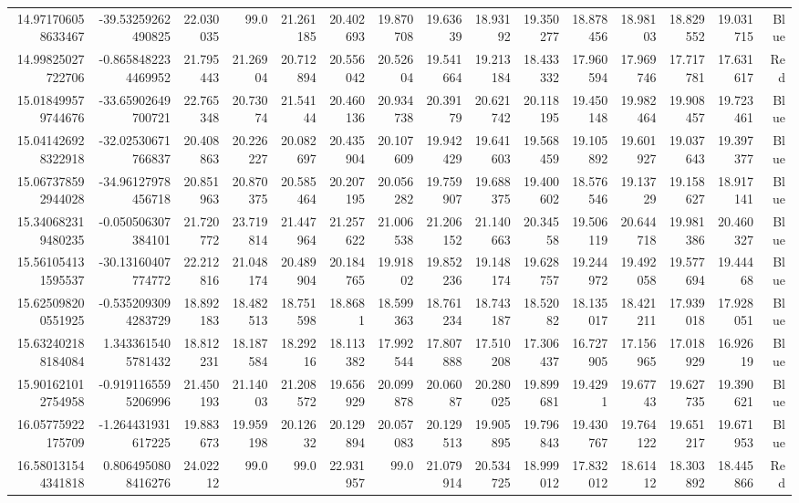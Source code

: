 \begin{center}
\begin{longtable}{rrrrrrrrrrrrrrr}
14.971706058633467 & -39.53259262490825 & 22.030035 & 99.0 & 21.261185 & 20.402693 & 19.870708 & 19.63639 & 18.93192 & 19.350277 & 18.878456 & 18.98103 & 18.829552 & 19.031715 & Blue \\
14.99825027722706 & -0.8658482234469952 & 21.795443 & 21.26904 & 20.712894 & 20.556042 & 20.52604 & 19.541664 & 19.213184 & 18.433332 & 17.960594 & 17.969746 & 17.717781 & 17.631617 & Red \\
15.018499579744676 & -33.65902649700721 & 22.765348 & 20.73074 & 21.54144 & 20.460136 & 20.934738 & 20.39179 & 20.621742 & 20.118195 & 19.450148 & 19.982464 & 19.908457 & 19.723461 & Blue \\
15.041426928322918 & -32.02530671766837 & 20.408863 & 20.226227 & 20.082697 & 20.435904 & 20.107609 & 19.942429 & 19.641603 & 19.568459 & 19.105892 & 19.601927 & 19.037643 & 19.397377 & Blue \\
15.067378592944028 & -34.96127978456718 & 20.851963 & 20.870375 & 20.585464 & 20.207195 & 20.056282 & 19.759907 & 19.688375 & 19.400602 & 18.576546 & 19.13729 & 19.158627 & 18.917141 & Blue \\
15.340682319480235 & -0.050506307384101 & 21.720772 & 23.719814 & 21.447964 & 21.257622 & 21.006538 & 21.206152 & 21.140663 & 20.34558 & 19.506119 & 20.644718 & 19.981386 & 20.460327 & Blue \\
15.561054131595537 & -30.13160407774772 & 22.212816 & 21.048174 & 20.489904 & 20.184765 & 19.91802 & 19.852236 & 19.148174 & 19.628757 & 19.244972 & 19.492058 & 19.577694 & 19.44468 & Blue \\
15.625098200551925 & -0.5352093094283729 & 18.892183 & 18.482513 & 18.751598 & 18.8681 & 18.599363 & 18.761234 & 18.743187 & 18.52082 & 18.135017 & 18.421211 & 17.939018 & 17.928051 & Blue \\
15.632402188184084 & 1.3433615405781432 & 18.812231 & 18.187584 & 18.29216 & 18.113382 & 17.992544 & 17.807888 & 17.510208 & 17.306437 & 16.727905 & 17.156965 & 17.018929 & 16.92619 & Blue \\
15.901621012754958 & -0.9191165595206996 & 21.450193 & 21.14003 & 21.208572 & 19.656929 & 20.099878 & 20.06087 & 20.280025 & 19.899681 & 19.4291 & 19.67743 & 19.627735 & 19.390621 & Blue \\
16.05775922175709 & -1.264431931617225 & 19.883673 & 19.959198 & 20.12632 & 20.129894 & 20.057083 & 20.129513 & 19.905895 & 19.796843 & 19.430767 & 19.764122 & 19.651217 & 19.671953 & Blue \\
16.580131544341818 & 0.8064950808416276 & 24.02212 & 99.0 & 99.0 & 22.931957 & 99.0 & 21.079914 & 20.534725 & 18.999012 & 17.832012 & 18.61412 & 18.303892 & 18.445866 & Red \\

\end{longtable}
\end{center}
